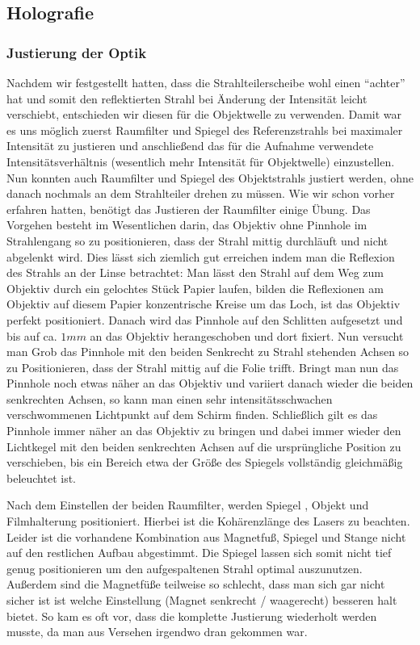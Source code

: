 \documentclass[12pt]{article}
\begin{document}
\subsection{Holografie}
\subsubsection{Justierung der Optik}
Nachdem wir festgestellt hatten, dass die Strahlteilerscheibe wohl einen ``achter'' hat und somit den reflektierten Strahl bei Änderung der Intensität leicht
verschiebt, entschieden wir diesen für die Objektwelle zu verwenden. Damit war es uns möglich zuerst Raumfilter und Spiegel des Referenzstrahls bei maximaler
Intensität zu justieren und anschließend das für die Aufnahme verwendete Intensitätsverhältnis (wesentlich mehr Intensität für Objektwelle) einzustellen. Nun 
konnten auch Raumfilter und Spiegel des Objektstrahls justiert werden, ohne danach nochmals an dem Strahlteiler drehen zu müssen.
Wie wir schon vorher erfahren hatten, benötigt das Justieren der Raumfilter einige Übung. Das Vorgehen besteht im Wesentlichen darin, das Objektiv
ohne Pinnhole im Strahlengang so zu positionieren, dass der Strahl mittig durchläuft und nicht abgelenkt wird. Dies lässt sich ziemlich gut erreichen
indem
man die Reflexion des Strahls an der Linse betrachtet: Man lässt den Strahl auf dem Weg zum Objektiv durch ein gelochtes Stück Papier laufen, bilden die 
Reflexionen am Objektiv auf diesem Papier konzentrische Kreise um das Loch, ist das Objektiv perfekt positioniert.
Danach wird das Pinnhole auf den Schlitten aufgesetzt
und bis auf ca. $1mm$ an das Objektiv herangeschoben und dort fixiert. Nun versucht man Grob das Pinnhole mit den beiden Senkrecht zu Strahl stehenden Achsen
so zu Positionieren, dass der Strahl mittig auf die Folie trifft. Bringt man nun das Pinnhole noch etwas näher an das Objektiv und variiert danach wieder die
beiden senkrechten Achsen, so kann man einen sehr intensitätsschwachen verschwommenen Lichtpunkt auf dem Schirm finden. Schließlich gilt es das Pinnhole immer
näher an das Objektiv zu bringen und dabei immer wieder den Lichtkegel mit den beiden senkrechten Achsen auf die ursprüngliche Position zu verschieben, bis 
ein Bereich etwa der Größe des Spiegels vollständig gleichmäßig beleuchtet ist.

Nach dem Einstellen der beiden Raumfilter, werden Spiegel , Objekt und Filmhalterung positioniert. Hierbei ist die Kohärenzlänge des Lasers zu beachten.
Leider ist die vorhandene Kombination aus Magnetfuß, Spiegel und Stange nicht auf den restlichen Aufbau abgestimmt. Die Spiegel lassen sich somit nicht tief
genug positionieren um den aufgespaltenen Strahl optimal auszunutzen. Außerdem sind die Magnetfüße teilweise so schlecht, dass man sich gar nicht sicher ist
ist welche Einstellung (Magnet senkrecht / waagerecht) besseren halt bietet. So kam es oft vor, dass die komplette Justierung wiederholt werden musste, da man
aus Versehen irgendwo dran gekommen war.
\end{document}
